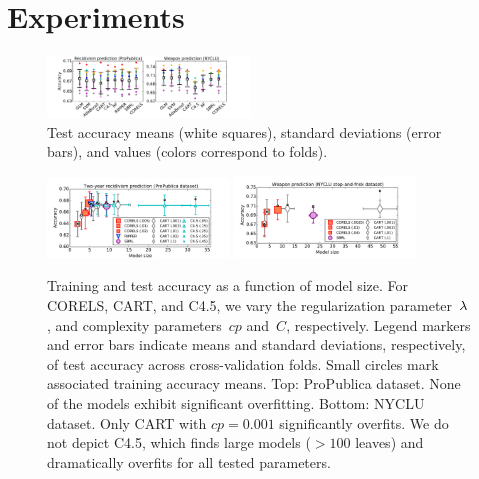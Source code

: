 \section{Experiments}
\label{sec:experiments}

\begin{figure}[t!]
\begin{center}
\includegraphics[trim={10mm, 11mm, 25mm, 5mm},
width=0.48\textwidth]{figs/compare-compas-weapon.pdf}
\end{center}
\caption{Test accuracy means (white squares),
standard deviations (error bars),
and values (colors correspond to folds).
}
\label{fig:comparison}
\end{figure}

\begin{figure}[t!]
\begin{center}
\includegraphics[trim={12mm, 0mm, 24mm, 5mm}, width=0.43\textwidth]{figs/compas-sparsity-training.pdf}
\includegraphics[trim={12mm, 12mm, 24mm, 1mm}, width=0.43\textwidth]{figs/frisk-sparsity-training.pdf}
\end{center}
\caption{Training and test accuracy as a function of model size.
%
For CORELS, CART, and C4.5, we vary the regularization parameter~${\lambda}$,
and complexity parameters~$cp$ and~$C$, respectively.
%
Legend markers and error bars indicate means and standard deviations,
respectively, of test accuracy across cross-validation folds.
%
Small circles mark associated training accuracy means.
%
Top:  %
ProPublica dataset.
%
None of the models exhibit significant overfitting.
%
Bottom:  %
NYCLU dataset.
%
Only CART with ${cp = 0.001}$ significantly overfits.
%
We do not depict C4.5, which finds large models (${>100}$ leaves)
and dramatically overfits for all tested parameters.
}
\label{fig:sparsity}
\end{figure}

